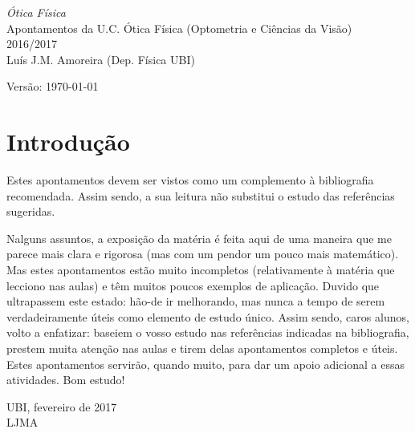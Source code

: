 \begin{titlepage}
\noindent
{\Huge\sffamily\textsl{Ótica Física}}\\[10mm]
{\Large\textsf{Apontamentos da U.C. Ótica Física
(Optometria e Ciências da Visão)}}\\[5mm]
{\Large\textsf 2016/2017}\\[15mm]
{\large\textsf{Luís J.M. Amoreira (Dep. Física UBI)}}

\vspace{35mm}
\noindent
{\small \textsf{Versão: \today}}
\vfill
\begin{center}
\end{center}
\vfill
\end{titlepage}
\thispagestyle{plain}
\section*{Introdução}
Estes apontamentos devem ser vistos como um complemento à bibliografia
recomendada. Assim sendo, a sua leitura não substitui o estudo das 
referências sugeridas.

\noindent
Nalguns assuntos, a exposição da matéria é feita aqui de uma maneira que me
parece mais clara e rigorosa (mas com um pendor um pouco mais matemático). Mas
estes apontamentos estão muito incompletos (relativamente à matéria que lecciono
nas aulas) e têm muitos poucos exemplos de aplicação. Duvido que ultrapassem
este estado: hão-de ir melhorando, mas nunca a tempo de serem verdadeiramente
úteis como elemento de estudo único. Assim sendo, caros alunos,
volto a enfatizar: baseiem o vosso estudo nas referências indicadas na
bibliografia, prestem muita atenção nas aulas e tirem delas apontamentos
completos e úteis. Estes apontamentos servirão, quando muito, para dar um apoio
adicional a essas atividades. 
\noindent
Bom estudo!

\vspace{2cm}
\hfill
\begin{minipage}{0.4\linewidth}
UBI, fevereiro de 2017\\
LJMA
\end{minipage}

\vspace{3cm}

